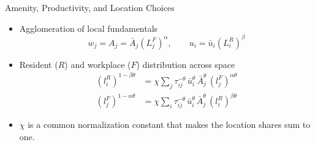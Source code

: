 \documentclass[11pt,aspectratio=169]{beamer}
\begin{document}
\begin{frame}{Amenity, Productivity, and Location Choices}
\begin{itemize}
  \item Agglomeration of local fundamentals
  \vspace{-0.5em}\begin{equation}\label{eq:agglom}
    w_j = A_j = \bar A_j\left(L_j^F\right)^\alpha, \qquad u_i=\bar u_i\left(L_i^R\right)^\beta
  \end{equation}
  \item Resident ($R$) and workplace ($F$) distribution across space
  \begin{align}
  (l_i^R)^{1-\beta\theta} & = \chi \sum_j\tau_{ij}^{-\theta}\,\bar u_i^{\theta}\,\bar A_j^{\theta}\,(l_j^F)^{\alpha\theta} \label{eq:clear1} \\
  (l_j^F)^{1-\alpha\theta} & = \chi \sum_i\tau_{ij}^{-\theta}\,\bar u_i^{\theta}\,\bar A_j^{\theta}\,(l_i^R)^{\beta\theta} \label{eq:clear2}
  \end{align}
  \vspace{-0.5em}
  \item $\chi$ is a common normalization constant that makes the location shares sum to one.
\end{itemize}
\end{frame}
\end{document}
